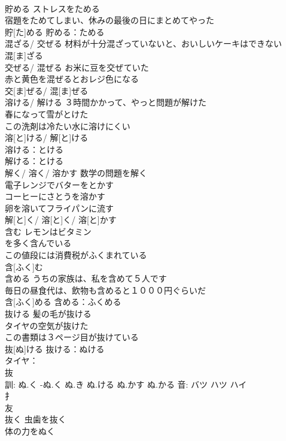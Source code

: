 \documentclass[8pt]{extreport}
\begin{document}
\begin{CJK}{UTF8}{min}
\\	貯める	ストレスをためる 
\\	宿題をためてしまい、休みの最後の日にまとめてやった 
\\	貯[た]める			貯める：ためる
\\	混ざる/ 交ぜる	材料が十分混ざっていないと、おいしいケーキはできない 
\\	混[ま]ざる						
\\	交ぜる/ 混ぜる	お米に豆を交ぜていた 
\\	赤と黄色を混ぜるとおレジ色になる 
\\	交[ま]ぜる/ 混[ま]ぜる						
\\	溶ける/ 解ける	３時間かかって、やっと問題が解けた 
\\	春になって雪がとけた 
\\	この洗剤は冷たい水に溶けにくい 
\\	溶[と]ける/ 解[と]ける			
\\	溶ける：とける
\\	解ける：とける
\\	解く/ 溶く/ 溶かす	数学の問題を解く 
\\	電子レンジでバターをとかす 
\\	コーヒーにさとうを溶かす 
\\	卵を溶いてフライパンに流す 
\\	解[と]く/ 溶[と]く/ 溶[と]かす						
\\	含む	レモンはビタミン
\\	を多く含んでいる 
\\	この値段には消費税がふくまれている 
\\	含[ふく]む						
\\	含める	うちの家族は、私を含めて５人です 
\\	毎日の昼食代は、飲物も含めると１０００円ぐらいだ 
\\	含[ふく]める					含める：ふくめる
\\	抜ける	髪の毛が抜ける 
\\	タイヤの空気が抜けた 
\\	この書類は３ページ目が抜けている 
\\	抜[ぬ]ける			抜ける：ぬける
\\	タイヤ：
\\	抜 
\\	訓: ぬ.く -ぬ.く ぬ.き ぬ.ける ぬ.かす ぬ.かる 音: バツ ハツ ハイ 
\\	扌 
\\	友 
\\	抜く	虫歯を抜く 
\\	体の力をぬく 

\end{CJK}
\end{document}
